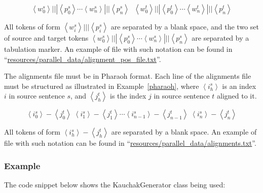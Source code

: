 \begin{equation}
\label{parsedparallel}
\left \langle w_{0}^{s} \right \rangle\! |||\! \left \langle p_{0}^{s} \right \rangle\cdots\left \langle w_{n}^{s} \right \rangle\!|||\!\left \langle p_{n}^{s} \right \rangle \;\; \left \langle w_{0}^{t} \right \rangle\! |||\! \left \langle p_{0}^{t} \right \rangle\cdots\left \langle w_{n}^{t} \right \rangle\!|||\!\left \langle p_{n}^{t} \right \rangle
\end{equation}

All tokens of form $\left \langle w_{i}^{s} \right \rangle\! |||\! \left \langle p_{i}^{s} \right \rangle$ are separated by a blank space, and the two set of source and target tokens $\left \langle w_{0}^{s} \right \rangle\! |||\! \left \langle p_{0}^{s} \right \rangle\cdots\left \langle w_{n}^{s} \right \rangle\!|||\!\left \langle p_{n}^{s} \right \rangle$ are separated by a tabulation marker. An example of file with such notation can be found in ``\url{resources/parallel_data/alignment_pos_file.txt}''.

The alignments file must be in Pharaoh format. Each line of the alignments file must be structured as illustrated in Example~\ref{pharaoh}, where $\left \langle i_{h}^{s} \right \rangle$ is an index $i$ in source sentence $s$, and $\left \langle j_{h}^{t} \right \rangle$ is the index $j$ in source sentence $t$ aligned to it.

\begin{equation}
\label{pharaoh}
\left \langle i_{0}^{s} \right \rangle\! -\! \left \langle j_{0}^{t} \right \rangle\; \left \langle i_{1}^{s} \right \rangle\! -\! \left \langle j_{1}^{t} \right \rangle\cdots\left \langle i_{n-1}^{s} \right \rangle\! -\! \left \langle j_{n-1}^{t} \right \rangle\; \left \langle i_{n}^{s} \right \rangle\! -\! \left \langle j_{n}^{t} \right \rangle
\end{equation}

All tokens of form $\left \langle i_{h}^{s} \right \rangle\! -\! \left \langle j_{h}^{t} \right \rangle$ are separated by a blank space. An example of file with such notation can be found in ``\url{resources/parallel_data/alignments.txt}''.

\subsubsection{Example}

The code snippet below shows the KauchakGenerator class being used:

